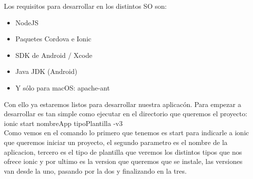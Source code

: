 \documentclass[a4paper, 11pt]{article}
\begin{document}
\begin{itemize}
            Los requisitos para desarrollar en los distintos SO son:
            \begin{itemize}
                \item{NodeJS}
                \item{Paquetes Cordova e Ionic}
                \item{SDK de Android / Xcode}
                \item{Java JDK (Android)}
                \item{Y sólo para macOS: apache-ant}
            \end{itemize}

            Con ello ya estaremos listos para desarrollar nuestra aplicacón. Para
            empezar a desarrollar es tan simple como ejecutar en el directorio que
            queremos el proyecto: ionic start nombreApp tipoPlantilla -v3\\

            Como vemos en el comando lo primero que tenemos es start para indicarle
            a ionic que queremos iniciar un proyecto, el segundo parametro es el
            nombre de la aplicacion, tercero es el tipo de plantilla que veremos los
            distintos tipos que nos ofrece ionic y por ultimo es la version que
            queremos que se instale, las versiones van desde la uno, pasando por la
            dos y finalizando en la tres.



\end{itemize}
\end{document}

